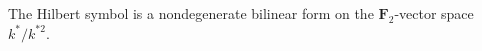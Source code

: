 The Hilbert symbol is a nondegenerate bilinear form on the $\mathbf{F}_2$-vector space $k^*/k^{*2}$.
